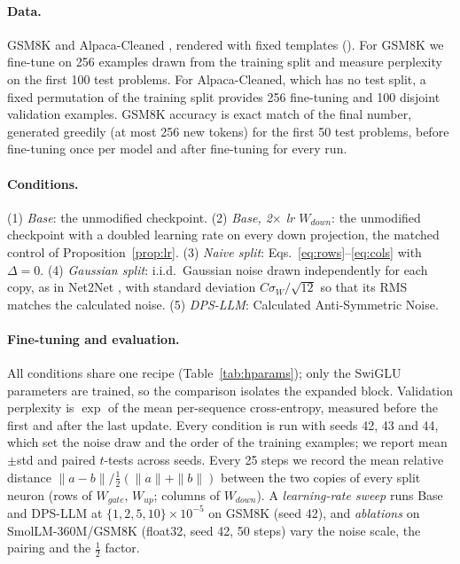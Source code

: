 \paragraph{Data.}
GSM8K \citep{cobbe2021gsm8k} and Alpaca-Cleaned \citep{taori2023alpaca,yahma2023alpacacleaned}, rendered with fixed templates (). For GSM8K we fine-tune on 256 examples drawn from the training split and measure perplexity on the first 100 test problems. For Alpaca-Cleaned, which has no test split, a fixed permutation of the training split provides 256 fine-tuning and 100 disjoint validation examples. GSM8K accuracy is exact match of the final number, generated greedily (at most 256 new tokens) for the first 50 test problems, before fine-tuning once per model and after fine-tuning for every run.

\paragraph{Conditions.}
(1) \emph{Base}: the unmodified checkpoint. (2) \emph{Base, 2$\times$ lr $W_{down}$}: the unmodified checkpoint with a doubled learning rate on every down projection, the matched control of Proposition~\ref{prop:lr}. (3) \emph{Naive split}: Eqs.~\eqref{eq:rows}--\eqref{eq:cols} with $\Delta{=}0$. (4) \emph{Gaussian split}: i.i.d.\ Gaussian noise drawn independently for each copy, as in Net2Net \citep{chen2015net2net}, with standard deviation $C\sigma_W/\sqrt{12}$ so that its RMS matches the calculated noise. (5) \emph{DPS-LLM}: Calculated Anti-Symmetric Noise.

\paragraph{Fine-tuning and evaluation.}
All conditions share one recipe (Table~\ref{tab:hparams}); only the SwiGLU parameters are trained, so the comparison isolates the expanded block. Validation perplexity \citep{jelinek1977perplexity} is $\exp$ of the mean per-sequence cross-entropy, measured before the first and after the last update. Every condition is run with seeds 42, 43 and 44, which set the noise draw and the order of the training examples; we report mean$\pm$std and paired $t$-tests across seeds. Every 25 steps we record the mean relative distance $\|a-b\|/\tfrac{1}{2}(\|a\|+\|b\|)$ between the two copies of every split neuron (rows of $W_{gate}$, $W_{up}$; columns of $W_{down}$). A \emph{learning-rate sweep} runs Base and DPS-LLM at $\{1,2,5,10\}\times10^{-5}$ on GSM8K (seed 42), and \emph{ablations} on SmolLM-360M/GSM8K (float32, seed 42, 50 steps) vary the noise scale, the pairing and the $\tfrac{1}{2}$ factor.

